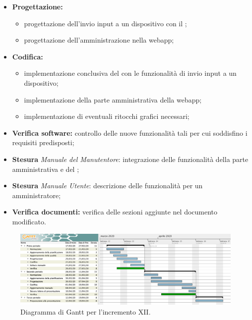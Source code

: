 					\begin{itemize}
						\item \textbf{Progettazione:} 
						\begin{itemize}
							\item progettazione dell'invio input a un dispositivo con il ;
							\item progettazione dell'amministrazione nella webapp;
						\end{itemize}
						\item \textbf{Codifica:} 
						\begin{itemize}
							\item implementazione conclusiva del  con le funzionalità di invio input a un dispositivo; 
							\item implementazione della parte amministrativa della webapp;
							\item implementazione di eventuali ritocchi grafici necessari;
						\end{itemize}
						\item \textbf{Verifica software:} controllo delle nuove funzionalità tali per cui soddisfino i requisiti predisposti;
						\item \textbf{Stesura} \textit{Manuale del Manutentore}: integrazione delle funzionalità della parte amministrativa e del ;
						\item \textbf{Stesura} \textit{Manuale Utente}: descrizione delle funzionalità per un amministratore;
						\item \textbf{Verifica documenti:} verifica delle sezioni aggiunte nel documento modificato.
					\end{itemize} 			

		\begin{landscape}
          \begin{figure}[H]
            \centering
            \includegraphics[width=\linewidth]{images/ganttDettaglioCodifica} %
            \caption{Diagramma di Gantt per l'incremento XII.}
          \end{figure}		
		\end{landscape}

